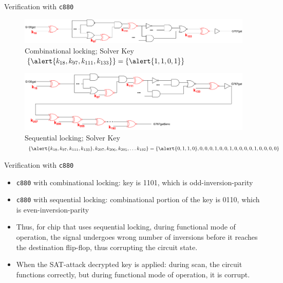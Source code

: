 \begin{frame}{Verification with \texttt{c880}}
	\begin{figure}
		\begin{center}
		\label{fig:c880-c-l}
		\caption{Combinational locking; Solver Key $\{\alert{k_{18}, k_{97}, k_{111}, k_{133}}\} = \{\alert{1,1,0,1}\}$}
			\includegraphics[scale=0.2]{fig/c880_combinational_locking_motivation.pdf}
		\end{center}
	\end{figure}
	\begin{figure}
		\begin{center}
		\label{fig:c880-s-c-l}
		\caption{Sequential locking; Solver Key $\{\alert{k_{18}, k_{97}, k_{111}, k_{133}}, k_{207}, k_{206}, k_{205}, \ldots k_{192}\} = \{\alert{0,1,1,0},0,0,0,1,0,0,1,0,0,0,0,1,0,0,0,0\}$}
			\includegraphics[scale=0.2]{fig/c880_sequential_combinational_locking_motivation.pdf}
		\end{center}
	\end{figure}
\end{frame}

\begin{frame}{Verification with \texttt{c880}}
\begin{itemize}
\item \texttt{c880} with combinational locking: key is \alert{1101}, which is odd-inversion-parity
\item \texttt{c880} with sequential locking: combinational portion of the key is \alert{0110}, which is even-inversion-parity
\item Thus, for chip that uses sequential locking, during functional mode of operation, the signal undergoes \alert{wrong} number of inversions before it reaches the destination flip-flop, thus corrupting the circuit state.
\item When the SAT-attack decrypted key is applied: during scan, the circuit functions correctly, but during functional mode of operation, it is corrupt. 
\end{itemize}
\end{frame}

